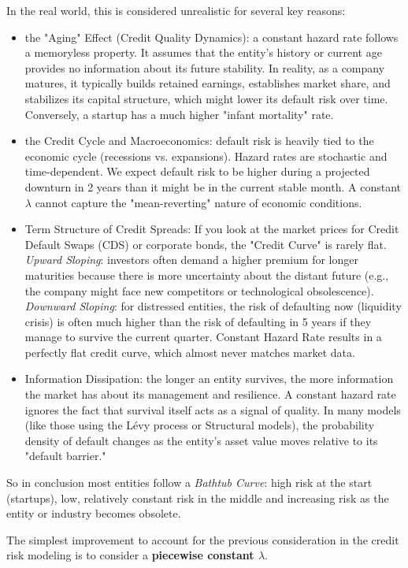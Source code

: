 In the real world, this is considered unrealistic for several key reasons:
\begin{itemize}
	\item the "Aging" Effect (Credit Quality Dynamics): a constant hazard rate follows a memoryless property. It assumes that the entity's history or current age provides no information about its future stability. In reality, as a company matures, it typically builds retained earnings, establishes market share, and stabilizes its capital structure, which might lower its default risk over time. Conversely, a startup has a much higher "infant mortality" rate.
	\item the Credit Cycle and Macroeconomics: default risk is heavily tied to the economic cycle (recessions vs. expansions). Hazard rates are stochastic and time-dependent. We expect default risk to be higher during a projected downturn in 2 years than it might be in the current stable month. A constant $\lambda$ cannot capture the "mean-reverting" nature of economic conditions.
	\item Term Structure of Credit Spreads: If you look at the market prices for Credit Default Swaps (CDS) or corporate bonds, the "Credit Curve" is rarely flat.    \textit{Upward Sloping}: investors often demand a higher premium for longer maturities because there is more uncertainty about the distant future (e.g., the company might face new competitors or technological obsolescence). \textit{Downward Sloping}: for distressed entities, the risk of defaulting now (liquidity crisis) is often much higher than the risk of defaulting in 5 years if they manage to survive the current quarter. Constant Hazard Rate results in a perfectly flat credit curve, which almost never matches market data.
	\item Information Dissipation: the longer an entity survives, the more information the market has about its management and resilience. A constant hazard rate ignores the fact that survival itself acts as a signal of quality. In many models (like those using the Lévy process or Structural models), the probability density of default changes as the entity's asset value moves relative to its "default barrier."
\end{itemize}

So in conclusion most entities follow a \textit{Bathtub Curve}: high risk at the start (startups), low, relatively constant risk in the middle and increasing risk as the entity or industry becomes obsolete.

The simplest improvement to account for the previous consideration in the credit risk modeling is to consider a \textbf{piecewise constant $\lambda$}.

